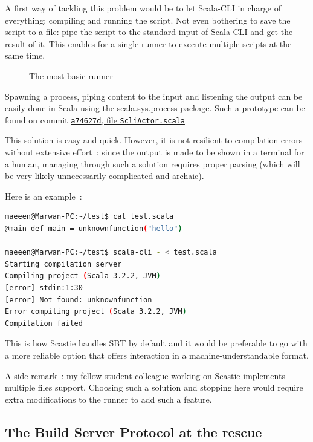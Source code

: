 \documentclass{article}
\begin{document}
A first way of tackling this problem would be to let Scala-CLI in charge of everything: compiling and running the script. Not even bothering to save the script to a file: pipe the script to the standard input of Scala-CLI and get the result of it. This enables for a single runner to execute multiple scripts at the same time.

\begin{figure}[H]
    \centering
    
    \caption{The most basic runner}
\end{figure}

Spawning a process, piping content to the input and listening the output can be easily done in Scala using the \href{https://dotty.epfl.ch/api/scala/sys/process.html}{scala.sys.process} package. Such a prototype can be found on commit \href{https://github.com/Maeeen/scastie/blob/a74627d080f70f664931133632f06f514a2856f8/scli-runner/src/main/scala/com.olegych.scastie.sclirunner/ScliActor.scala}{\lstinline{a74627d}, file \lstinline{ScliActor.scala}}

This solution is easy and quick. However, it is not resilient to compilation errors without extensive effort~: since the output is made to be shown in a terminal for a human, managing through such a solution requires proper parsing (which will be very likely unnecessarily complicated and archaic).

Here is an example~: 

\begin{lstlisting}[language=bash,frame=tb,basicstyle={\small\ttfamily},frame=single]
maeeen@Marwan-PC:~/test$ cat test.scala
@main def main = unknownfunction("hello")

maeeen@Marwan-PC:~/test$ scala-cli - < test.scala
Starting compilation server
Compiling project (Scala 3.2.2, JVM)
[error] stdin:1:30
[error] Not found: unknownfunction
Error compiling project (Scala 3.2.2, JVM)
Compilation failed
\end{lstlisting}

This is how Scastie handles SBT by default and it would be preferable to go with a more reliable option that offers interaction in a machine-understandable format.

A side remark~: my fellow student colleague working on Scastie implements multiple files support. Choosing such a solution and stopping here would require extra modifications to the runner to add such a feature.

\subsection{The Build Server Protocol at the rescue}
\end{document}
